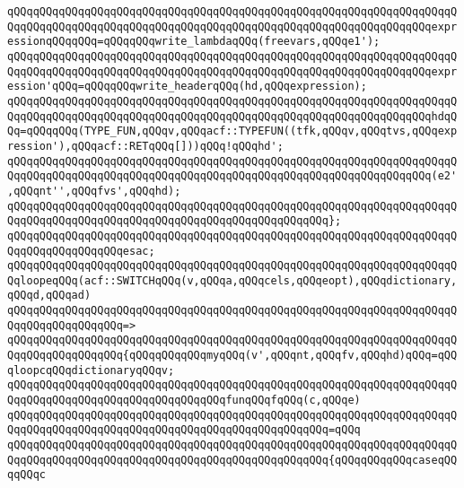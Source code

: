 \verb|qQQqqQQqqQQqqQQqqQQqqQQqqQQqqQQqqQQqqQQqqQQqqQQqqQQqqQQqqQQqqQQqqQQqqQQqqQQqqQQqqQQqqQQqqQQqqQQqqQQqqQQqqQQqqQQqqQQqqQQqqQQqqQQqqQQqqQQqexpressionqQQqqQQq=qQQqqQQqwrite_lambdaqQQq(freevars,qQQqe1');|\newline
\verb|qQQqqQQqqQQqqQQqqQQqqQQqqQQqqQQqqQQqqQQqqQQqqQQqqQQqqQQqqQQqqQQqqQQqqQQqqQQqqQQqqQQqqQQqqQQqqQQqqQQqqQQqqQQqqQQqqQQqqQQqqQQqqQQqqQQqqQQqexpression'qQQq=qQQqqQQqwrite_headerqQQq(hd,qQQqexpression);|\newline
\newline
\verb|qQQqqQQqqQQqqQQqqQQqqQQqqQQqqQQqqQQqqQQqqQQqqQQqqQQqqQQqqQQqqQQqqQQqqQQqqQQqqQQqqQQqqQQqqQQqqQQqqQQqqQQqqQQqqQQqqQQqqQQqqQQqqQQqqQQqqQQqhdqQQq=qQQqqQQq(TYPE_FUN,qQQqv,qQQqacf::TYPEFUN((tfk,qQQqv,qQQqtvs,qQQqexpression'),qQQqacf::RETqQQq[]))qQQq!qQQqhd';|\newline
\newline
\verb|qQQqqQQqqQQqqQQqqQQqqQQqqQQqqQQqqQQqqQQqqQQqqQQqqQQqqQQqqQQqqQQqqQQqqQQqqQQqqQQqqQQqqQQqqQQqqQQqqQQqqQQqqQQqqQQqqQQqqQQqqQQqqQQqqQQqqQQq(e2',qQQqnt'',qQQqfvs',qQQqhd);|\newline
\verb|qQQqqQQqqQQqqQQqqQQqqQQqqQQqqQQqqQQqqQQqqQQqqQQqqQQqqQQqqQQqqQQqqQQqqQQqqQQqqQQqqQQqqQQqqQQqqQQqqQQqqQQqqQQqqQQqqQQqqQQq};|\newline
\verb|qQQqqQQqqQQqqQQqqQQqqQQqqQQqqQQqqQQqqQQqqQQqqQQqqQQqqQQqqQQqqQQqqQQqqQQqqQQqqQQqqQQqqQQqesac;|\newline
\newline
\verb|qQQqqQQqqQQqqQQqqQQqqQQqqQQqqQQqqQQqqQQqqQQqqQQqqQQqqQQqqQQqqQQqqQQqqQQqloopeqQQq(acf::SWITCHqQQq(v,qQQqa,qQQqcels,qQQqeopt),qQQqdictionary,qQQqd,qQQqad)|\newline
\verb|qQQqqQQqqQQqqQQqqQQqqQQqqQQqqQQqqQQqqQQqqQQqqQQqqQQqqQQqqQQqqQQqqQQqqQQqqQQqqQQqqQQqqQQq=>|\newline
\verb|qQQqqQQqqQQqqQQqqQQqqQQqqQQqqQQqqQQqqQQqqQQqqQQqqQQqqQQqqQQqqQQqqQQqqQQqqQQqqQQqqQQqqQQq{qQQqqQQqqQQqmyqQQq(v',qQQqnt,qQQqfv,qQQqhd)qQQq=qQQqloopcqQQqdictionaryqQQqv;|\newline
\newline
\verb|qQQqqQQqqQQqqQQqqQQqqQQqqQQqqQQqqQQqqQQqqQQqqQQqqQQqqQQqqQQqqQQqqQQqqQQqqQQqqQQqqQQqqQQqqQQqqQQqqQQqqQQqfunqQQqfqQQq(c,qQQqe)|\newline
\verb|qQQqqQQqqQQqqQQqqQQqqQQqqQQqqQQqqQQqqQQqqQQqqQQqqQQqqQQqqQQqqQQqqQQqqQQqqQQqqQQqqQQqqQQqqQQqqQQqqQQqqQQqqQQqqQQqqQQqqQQq=qQQq|\newline
\verb|qQQqqQQqqQQqqQQqqQQqqQQqqQQqqQQqqQQqqQQqqQQqqQQqqQQqqQQqqQQqqQQqqQQqqQQqqQQqqQQqqQQqqQQqqQQqqQQqqQQqqQQqqQQqqQQqqQQqqQQq{qQQqqQQqqQQqcaseqQQqqQQqc|\newline
